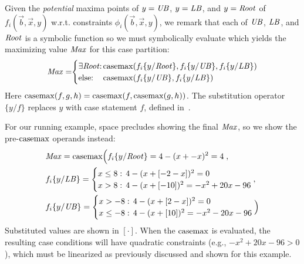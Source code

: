 Given the \emph{potential} maxima points of $y = \mathit{UB}$, $y = \mathit{LB}$, and $y =
\mathit{Root}$ of $f_i(\vec{b},\vec{x},y)$ w.r.t. constraints
$\phi_i(\vec{b},\vec{x},y)$, we remark that each of 
$\mathit{UB}$, $\mathit{LB}$, and $\mathit{Root}$ is a symbolic function so we must 
symbolically evaluate which yields the maximizing value $\mathit{Max}$
for this case partition:
{\footnotesize
\begin{align*}
\Max =  \sq \begin{cases}
\mbox{$\exists \Root$}  \sq: \sq & \sqm \casemax( f_i \{ y / \Root \}, f_i \{ y / \UB \}, f_i \{ y / \LB \})\\
\mbox{else}  \sq:  \sq & \sqm \casemax( f_i \{ y / \UB \}, f_i \{ y / \LB \})
\end{cases}
\end{align*}}
Here $\mathrm{casemax}(f,g,h) = \mathrm{casemax}(f,\mathrm{casemax}(g,h))$.  The 
substitution operator $\{ y / f \}$ replaces $y$ with case statement $f$, 
defined in~\cite{sanner_uai11}.

For our running example, space precludes showing the final 
$\mathit{Max}$, so we show the pre-$\mathrm{casemax}$ operands instead:
{\footnotesize 
\begin{align*}
& \Max = \casemax \Big( f_i \{ y / \Root \} = 4 - (x + -x)^2 = 4 \; , \\
& f_i \{ y / \LB \} = \begin{cases}
x \leq 8: & \sqm 4 - (x + [-2 - x])^2 = 0 \\ 
x > 8:    & \sqm 4 - (x + [-10])^2 = -x^2 +20x -96\\ 
\end{cases},\\
& f_i \{ y / \UB \} = \begin{cases}
x > -8:    & \sqm 4 - (x + [2 - x])^2 = 0 \\ 
x \leq -8: & \sqm 4 - (x + [10])^2 = -x^2 -20x -96\\ 
\end{cases} \Big)
\end{align*}}
Substituted values are shown in $[\cdot]$.  
When the $\mathrm{casemax}$ is evaluated, the resulting case conditions
will have quadratic constraints (e.g., $-x^2 +20x -96 > 0$), 
which must be linearized as previously discussed and shown
for this example.

